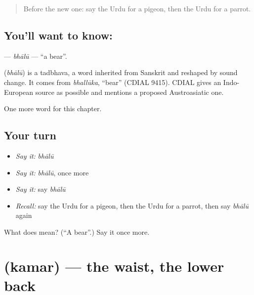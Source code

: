 \label{lesson:UR-C128-bhalu}



\begin{quote}
Before the new one: say the Urdu for a pigeon, then the Urdu for a parrot.
\end{quote}

\subsection*{You'll want to know: }
\textbf{} — \emph{bhālū} — \textquotedblleft{}a bear\textquotedblright{}.

\begin{cousinweb}
\textbf{} (\emph{bhālū}) is a tadbhava, a word inherited from Sanskrit and reshaped by sound change. It comes from \emph{bhallūka}, \textquotedblleft{}bear\textquotedblright{} (CDIAL 9415). CDIAL gives an Indo-European source as possible and mentions a proposed Austroasiatic one.
\end{cousinweb}

\begin{grammarlens}[title={What you've built}]
One more word for this chapter.
\end{grammarlens}

\subsection*{Your turn}
\begin{itemize}
\raggedright
  \item \emph{Say it:} \emph{bhālū}
  \item \emph{Say it:} \emph{bhālū}, once more
  \item \emph{Say it:} say \emph{bhālū}
  \item \emph{Recall:} say the Urdu for a pigeon, then the Urdu for a parrot, then say \emph{bhālū} again
\end{itemize}

\begin{tcolorbox}[breakable,colback=teal!4,colframe=teal!35!black,title={Before you move on}]
What does  mean? (\textquotedblleft{}A bear\textquotedblright{}.) Say it once more.
\end{tcolorbox}
\section[\texorpdfstring{\ur{کمر} (kamar)}{کمر (kamar)}]{ (kamar) — the waist, the lower back}

